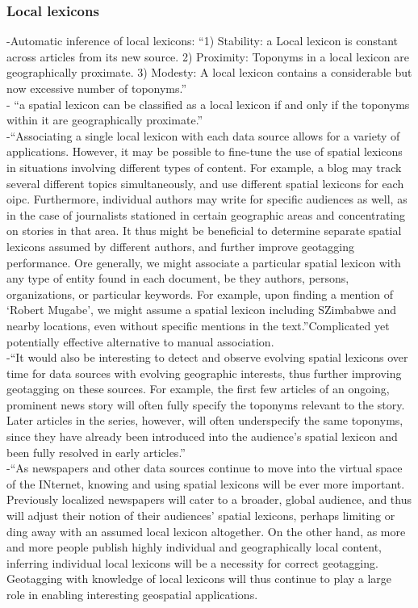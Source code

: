 \subsubsection{Local lexicons}
-{\color{orange}Automatic inference of local lexicons: “1) Stability: a Local lexicon is constant across articles from its new source. 2) Proximity: Toponyms in a local lexicon are geographically proximate. 3) Modesty: A local lexicon contains a considerable but now excessive number of toponyms.”\cite{Lieberman2010}}\\
-{\color{orange} “a spatial lexicon can be classified as a local lexicon if and only if the toponyms within it are geographically proximate.”\cite{Lieberman2010}}\\
-{\color{orange}“Associating a single local lexicon with each data source allows for a variety of applications. However, it may be possible to fine-tune the use of spatial lexicons in situations involving different types of content. For example, a blog may track several different topics simultaneously, and use different spatial lexicons for each oipc. Furthermore, individual authors may write for specific audiences as well, as in the case of journalists stationed in certain geographic areas and concentrating on stories in that area. It thus might be beneficial to determine separate spatial lexicons assumed by different authors, and further improve geotagging performance. Ore generally, we might associate a particular spatial lexicon with any type of entity found in each document, be they authors, persons, organizations, or particular keywords. For example, upon finding a mention of ‘Robert Mugabe’, we might assume a spatial lexicon including SZimbabwe and nearby locations, even without specific mentions in the text.”\cite{Lieberman2010}}{\color{purple}Complicated yet potentially effective alternative to manual association.\cite{Lieberman2010}}\\
-{\color{orange}“It would also be interesting to detect and observe evolving spatial lexicons over time for data sources with evolving geographic interests, thus further improving geotagging on these sources. For example, the first few articles of an ongoing, prominent news story will often fully specify the toponyms relevant to the story. Later articles in the series, however, will often underspecify the same toponyms, since they have already been introduced into the audience’s spatial lexicon and been fully resolved in early articles.”\cite{Lieberman2010}}\\
-{\color{orange}“As newspapers and other data sources continue to move into the virtual space of the INternet, knowing and using spatial lexicons will be ever more important. Previously localized newspapers will cater to a broader, global audience, and thus will adjust their notion of their audiences’ spatial lexicons, perhaps limiting or ding away with an assumed local lexicon altogether. On the other hand, as more and more people publish highly individual and geographically local content, inferring individual local lexicons will be a necessity for correct geotagging. Geotagging with knowledge of local lexicons will thus continue to play a large role in enabling interesting geospatial applications.\cite{Lieberman2010}}\\

